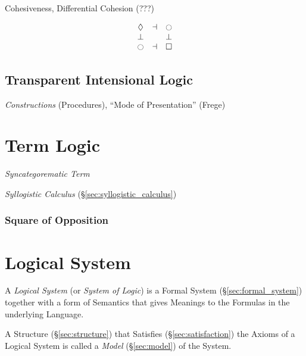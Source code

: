 Cohesiveness, Differential Cohesion (???)

\[
  \begin{matrix}
    \lozenge & \dashv & \ocircle \\
    \bot & \empty & \bot \\
    \ocircle & \dashv & \square
  \end{matrix}
\]



\subsection{Transparent Intensional Logic}
\label{sec:transparent_intensional_logic}

\emph{Constructions} (Procedures), ``Mode of Presentation'' (Frege)



\section{Term Logic}\label{sec:term_logic}

\emph{Syncategorematic Term}

\emph{Syllogistic Calculus} (\S\ref{sec:syllogistic_calculus})



\subsubsection{Square of Opposition}\label{sec:square_of_opposition}



\section{Logical System}\label{sec:logical_system}

A \emph{Logical System} (or \emph{System of Logic}) is a Formal System
(\S\ref{sec:formal_system}) together with a form of Semantics that
gives Meanings to the Formulas in the underlying Language.

A Structure (\S\ref{sec:structure}) that Satisfies
(\S\ref{sec:satisfaction}) the Axioms of a Logical System is called a
\emph{Model} (\S\ref{sec:model}) of the System.



